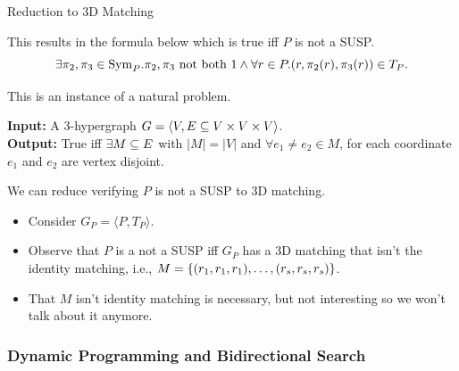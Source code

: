 \documentclass[t,10pt,
mathserif,xcolor=dvipsnames]{beamer}
\begin{document}
\begin{myframe}{Reduction to 3D Matching}

  This results in the formula below which is true iff $P$ is not a SUSP.\\[-3ex]
  
  $$\exists \pi_2,\pi_3 \in \mathrm{Sym}_{P}. \pi_2, \pi_3 \text{ not both } 1 \wedge
  \forall r \in P. (r,\pi_2(r),\pi_3(r)) \in T_P.$$

  \medskip
  
  This is an instance of a natural \NP problem.

  \medskip
  
  \begin{problem}[3D Matching]
    \textbf{Input:} A 3-hypergraph $G = \langle V, E \subseteq V \times V
    \times V\rangle$. \\[1ex] \textbf{Output:} True iff $\exists M
    \subseteq E$ with $|M| = |V|$ and $\forall e_1 \neq e_2 \in M$, for
    each coordinate $e_1$ and $e_2$ are vertex disjoint.
  \end{problem}

  \medskip
  
  We can reduce verifying $P$ is not a SUSP to 3D matching.
  \begin{itemize}
  \item Consider $G_P = \langle P, T_P\rangle$.
  \item Observe that $P$ is a not a SUSP iff $G_P$ has a 3D matching
    that isn't the identity matching, i.e., $M = \{{(r_1,r_1,r_1),
      \ldots, (r_s,r_s,r_s)}\}$.
  \item That $M$ isn't identity matching is necessary, but not
    interesting so we won't talk about it anymore.
  \end{itemize}
  
\end{myframe}

\subsubsection{Dynamic Programming and Bidirectional Search}
\end{document}
